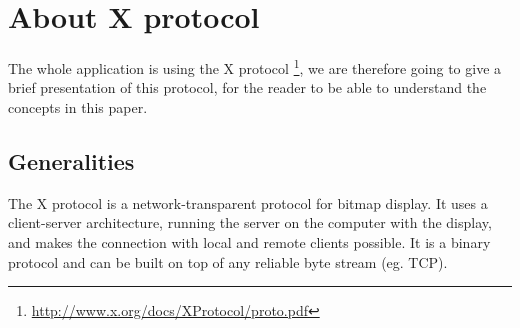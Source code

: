 \chapter{About X protocol}
The whole application is using the X protocol
\footnote{\url{http://www.x.org/docs/XProtocol/proto.pdf}}, 
we are therefore going to give a brief presentation of this protocol, 
for the reader to be able to understand the concepts in this paper.
\section{Generalities}
The X protocol is a network-transparent protocol for bitmap display. 
It uses a client-server architecture, running the server on the computer 
with the display, and makes the connection with local and remote clients possible. 
It is a binary protocol and can be built on top of any reliable byte stream (eg. TCP).
